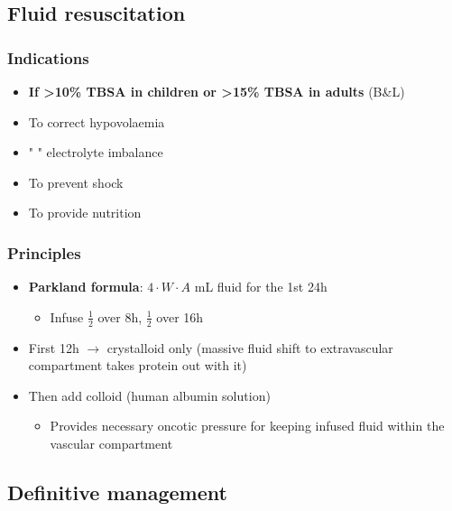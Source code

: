 \documentclass[
  14pt,
]{extarticle}
\providecommand{\tightlist}{%
  \setlength{\itemsep}{0pt}\setlength{\parskip}{0pt}}
\begin{document}
\hypertarget{fluid-resuscitation}{%
\subsection{Fluid resuscitation}\label{fluid-resuscitation}}

\hypertarget{indications-1}{%
\subsubsection{Indications}\label{indications-1}}

\begin{itemize}
\tightlist
\item
  \textbf{If \textgreater10\% TBSA in children or \textgreater15\% TBSA
  in adults} (B\&L)
\item
  To correct hypovolaemia
\item
  " " electrolyte imbalance
\item
  To prevent shock
\item
  To provide nutrition
\end{itemize}

\hypertarget{principles}{%
\subsubsection{Principles}\label{principles}}

\begin{itemize}
\tightlist
\item
  \textbf{Parkland formula}: \(4\cdot W \cdot A\) mL fluid for the 1st
  24h

  \begin{itemize}
  \tightlist
  \item
    Infuse \(\frac{1}{2}\) over 8h, \(\frac{1}{2}\) over 16h
  \end{itemize}
\item
  First 12h \(\rightarrow\) crystalloid only (massive fluid shift to
  extravascular compartment takes protein out with it)
\item
  Then add colloid (human albumin solution)

  \begin{itemize}
  \tightlist
  \item
    Provides necessary oncotic pressure for keeping infused fluid within
    the vascular compartment
  \end{itemize}
\end{itemize}

\hypertarget{definitive-management}{%
\subsection{Definitive management}\label{definitive-management}}
\end{document}
